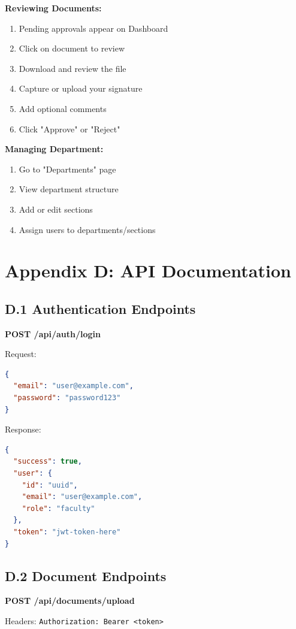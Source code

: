\textbf{Reviewing Documents:}
\begin{enumerate}
\item Pending approvals appear on Dashboard
\item Click on document to review
\item Download and review the file
\item Capture or upload your signature
\item Add optional comments
\item Click "Approve" or "Reject"
\end{enumerate}

\textbf{Managing Department:}
\begin{enumerate}
\item Go to "Departments" page
\item View department structure
\item Add or edit sections
\item Assign users to departments/sections
\end{enumerate}

\section{Appendix D: API Documentation}

\subsection{D.1 Authentication Endpoints}

\textbf{POST /api/auth/login}

Request:
\begin{lstlisting}[language=JSON]
{
  "email": "user@example.com",
  "password": "password123"
}
\end{lstlisting}

Response:
\begin{lstlisting}[language=JSON]
{
  "success": true,
  "user": {
    "id": "uuid",
    "email": "user@example.com",
    "role": "faculty"
  },
  "token": "jwt-token-here"
}
\end{lstlisting}

\subsection{D.2 Document Endpoints}

\textbf{POST /api/documents/upload}

Headers: \texttt{Authorization: Bearer <token>}

